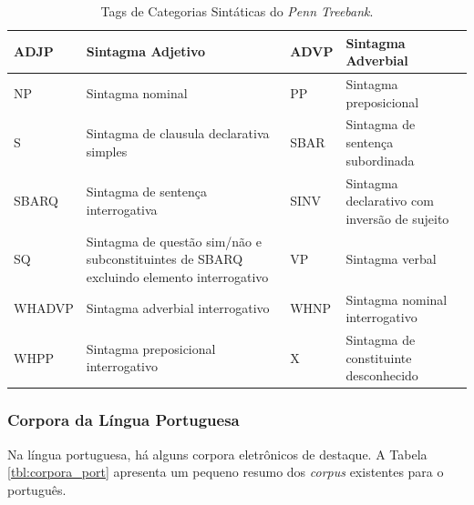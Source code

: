 \begin{table}[H]
   \centering
   \small
   \caption{ Tags de Categorias Sintáticas do \emph{Penn Treebank}.}

   \begin{tabular}{ | p{2cm} | p{4cm} | p{2cm} | p{4cm} |}

   \hline
		ADJP & Sintagma Adjetivo 	& 	ADVP & Sintagma Adverbial\\
   \hline
		NP & Sintagma nominal 	& 	PP & Sintagma preposicional\\
   \hline
		S & Sintagma de clausula declarativa simples 	& 	SBAR & Sintagma de sentença subordinada\\
   \hline
		SBARQ & Sintagma de sentença interrogativa 	& 	SINV & Sintagma declarativo com inversão de sujeito\\
   \hline
		SQ & Sintagma de questão sim/não e subconstituintes de SBARQ excluindo elemento interrogativo 	& 	 VP & Sintagma verbal\\
   \hline
		WHADVP & Sintagma adverbial interrogativo 	& 	WHNP & Sintagma nominal interrogativo\\
   \hline
		WHPP & Sintagma preposicional interrogativo &    	X & Sintagma de constituinte desconhecido \\
	\hline

   \end{tabular}
   \label{tbl:penn_treebank_cats}
\end{table}

\subsubsection{Corpora da Língua Portuguesa}
\label{sub:corpus_portugues}

Na língua portuguesa, há alguns corpora eletrônicos de destaque. A Tabela \ref{tbl:corpora_port} apresenta um pequeno resumo dos \emph{corpus} existentes para o português.

